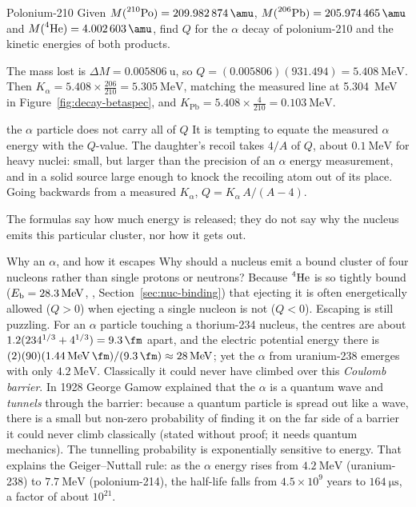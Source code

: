 \begin{exbox}{Polonium-210}\label{ex:decay-po210}
Given $M(\iso{210}{Po})=\SI{209.982874}{\amu}$, $M(\iso{206}{Pb})=\SI{205.974465}{\amu}$ and
$M(\iso4{He})=\SI{4.002603}{\amu}$, find $Q$ for the $\alpha$ decay of polonium-210 and the kinetic energies
of both products.

The mass lost is $\Delta M=\SI{0.005806}{\amu}$, so $Q=(0.005806)(931.494)=\SI{5.408}{\MeV}$. Then
$K_\alpha=5.408\times\tfrac{206}{210}=\SI{5.305}{\MeV}$, matching the measured line at \SI{5.304}{\MeV} in
Figure~\ref{fig:decay-betaspec}, and $K_{\mathrm{Pb}}=5.408\times\tfrac{4}{210}=\SI{0.103}{\MeV}$.
\end{exbox}

\begin{trapbox}{the $\alpha$ particle does not carry all of $Q$}
It is tempting to equate the measured $\alpha$ energy with the $Q$-value. The daughter's recoil takes
$4/A$ of $Q$, about $\SI{0.1}{\MeV}$ for heavy nuclei: small, but larger than the precision of an $\alpha$
energy measurement, and in a solid source large enough to knock the recoiling atom out of its place.
Going backwards from a measured $K_\alpha$, $Q=K_\alpha\,A/(A-4)$.
\end{trapbox}

The formulas say how much energy is released; they do not say why the nucleus emits this particular
cluster, nor how it gets out.

\begin{remarkbox}{Why an $\alpha$, and how it escapes}
Why should a nucleus emit a bound cluster of four nucleons rather than single protons or neutrons? Because
$\prescript{4}{}{\mathrm{He}}$ is so tightly bound ($\Eb=\SI{28.3}{\MeV}$, , Section~\ref{sec:nuc-binding}) that ejecting it is often
energetically allowed ($Q>0$) when ejecting a single nucleon is not ($Q<0$). Escaping is still puzzling.
For an $\alpha$ particle touching a thorium-234 nucleus, the centres are about
$1.2(234^{1/3}+4^{1/3})=\SI{9.3}{\fm}$ apart, and the electric potential energy there is
$(2)(90)(\SI{1.44}{\MeV.\fm})/(\SI{9.3}{\fm})\approx\SI{28}{\MeV}$; yet the $\alpha$ from uranium-238
emerges with only $\SI{4.2}{\MeV}$. Classically it could never have climbed over this \emph{Coulomb
barrier}. In 1928 George Gamow explained that the $\alpha$ is a quantum wave and \emph{tunnels} through
the barrier: because a quantum particle is spread out like a wave, there is a small but non-zero
probability of finding it on the far side of a barrier it could never climb classically (stated without
proof; it needs quantum mechanics). The tunnelling probability is exponentially sensitive to energy. That
explains the Geiger--Nuttall rule: as the $\alpha$ energy rises from $\SI{4.2}{\MeV}$ (uranium-238) to
$\SI{7.7}{\MeV}$ (polonium-214), the half-life falls from $4.5\times10^{9}$ years to $\SI{164}{\micro\second}$, a
factor of about $10^{21}$.
\end{remarkbox}

